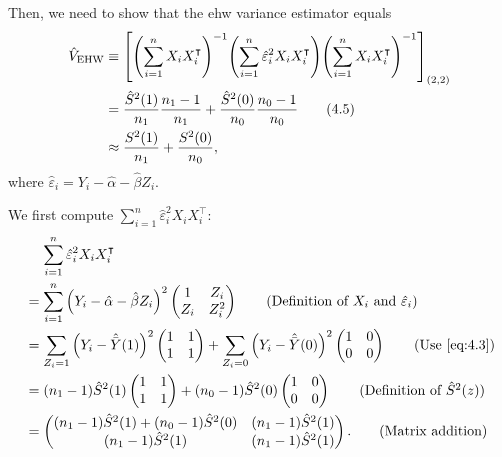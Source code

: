 \documentclass[10pt]{article}
\begin{document}
Then, we need to show that
the \gls{ehw} variance estimator equals
\begin{align*}
  \hat{V}_{\text{EHW}} 
  &\equiv {\left[ {\left( \sum_{i=1}^n X_i X_i^\intercal \right)}^{-1} {\left( \sum_{i=1}^n \hat{\varepsilon}_i^2 X_i X_i^\intercal \right)} {\left( \sum_{i=1}^n X_i X_i^\intercal \right)}^{-1} \right]}_{{\left( 2, 2 \right)}} \\
  &= \frac{\hat{S}^2(1)}{n_1} \frac{n_1 - 1}{n_1} + \frac{\hat{S}^2(0)}{n_0} \frac{n_0 - 1}{n_0} \tag{4.5} \label{eq:4.5} \\
  &\approx \frac{S^2(1)}{n_1} + \frac{S^2(0)}{n_0},
\end{align*}
where $\hat{\varepsilon}_i = Y_i - \hat{\alpha} - \hat{\beta} Z_i$.

We first compute $\sum_{i=1}^n \hat{\varepsilon}_i^2 X_i X_i^\intercal$:
\begin{align*}
  &\mathrel{\phantom{=}} \sum_{i=1}^n \hat{\varepsilon}_i^2 X_i X_i^\intercal \\
  &= \sum_{i=1}^n \bp{Y_i - \hat{\alpha} - \hat{\beta} Z_i}^2 
    \begin{pmatrix}
      1 & Z_i \\
      Z_i & Z_i^2
    \end{pmatrix} \tag{Definition of $X_i$ and $\hat{\varepsilon}_i$} \\
  &= \sum_{Z_i = 1} \bp{Y_i - \hat{\bar{Y}}(1)}^2 
    \begin{pmatrix}
      1 & 1 \\
      1 & 1
    \end{pmatrix}
    + \sum_{Z_i = 0} \bp{Y_i - \hat{\bar{Y}}(0)}^2 
    \begin{pmatrix}
      1 & 0 \\
      0 & 0
    \end{pmatrix} \tag{Use \cref{eq:4.3}} \\
  &= (n_1 - 1) \hat{S}^2(1)
    \begin{pmatrix}
      1 & 1 \\
      1 & 1
    \end{pmatrix}
    + (n_0 - 1) \hat{S}^2(0)
    \begin{pmatrix}
      1 & 0 \\
      0 & 0
    \end{pmatrix} \tag{Definition of $\hat{S}^2(z)$} \\
  &= \begin{pmatrix}
      (n_1 - 1) \hat{S}^2(1) + (n_0 - 1) \hat{S}^2(0) & (n_1 - 1) \hat{S}^2(1) \\
      (n_1 - 1) \hat{S}^2(1) & (n_1 - 1) \hat{S}^2(1)
    \end{pmatrix}. \tag{Matrix addition}
\end{align*}
\end{document}
